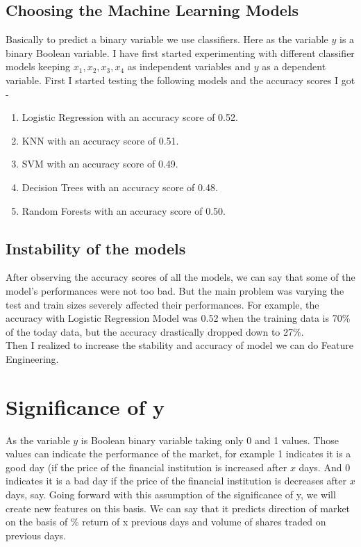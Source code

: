 \documentclass[conference]{IEEEtran}
\begin{document}
\subsection{Choosing the Machine Learning Models}
Basically to predict a binary variable we use classifiers. Here as the variable $y$ is a binary Boolean variable. I have first started experimenting with different classifier models keeping $x_{1}, x_{2}, x_{3}, x_{4}$ as independent variables and $y$ as a dependent variable. First I started testing the following models and the accuracy scores I got - 
\begin{enumerate}
\item Logistic Regression with an accuracy score of 0.52.
\item KNN with an accuracy score of 0.51.
\item SVM with an accuracy score of 0.49.
\item Decision Trees with an accuracy score of 0.48.
\item Random Forests with an accuracy score of 0.50.
\end{enumerate}
\subsection{Instability of the models}
After observing the accuracy scores of all the models, we can say that some of the model's performances were not too bad. But the main problem was varying the test and train sizes severely affected their performances. For example, the accuracy with Logistic Regression Model was 0.52 when the training data is 70\% of the today data, but the accuracy drastically dropped down to 27\%. \\

Then I realized to increase the stability and accuracy of model we can do Feature Engineering. 

\section{Significance of y}
As the variable $y$ is Boolean binary variable taking only 0 and 1 values. Those values can indicate the performance of the market, for example 1 indicates it is a good day (if the price of the financial institution is increased after $x$ days. And 0 indicates it is a bad day if the price of the financial institution is decreases after $x$ days, say. Going forward with this assumption of the significance of y, we will create new features on this basis. We can say that it predicts direction of market on the basis of \% return of x previous days and volume of shares traded on previous days.
\end{document}
